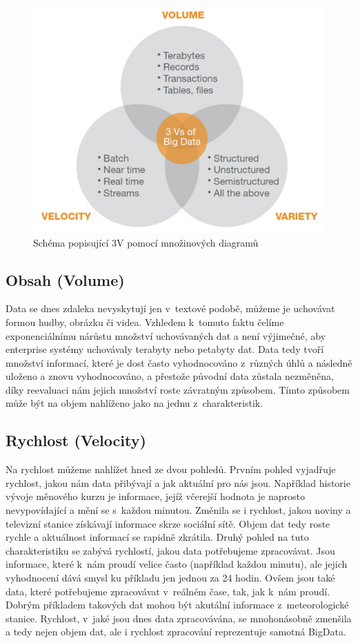 \begin{figure}[h]
\centering
\includegraphics[scale=0.6]{images/3v}
\caption{Schéma popisující 3V pomocí množinových diagramů \cite{3vimg}}
\label{fig:3v}

\end{figure}

\subsection[3v-volume]{Obsah (Volume)}
Data se dnes zdaleka nevyskytují jen v~textové podobě, můžeme je uchovávat formou hudby, obrázku či videa. Vzhledem k~tomuto faktu čelíme exponenciálnímu nárůstu množství uchovávaných dat a není výjimečné, aby enterprise systémy uchovávaly terabyty nebo petabyty dat. Data tedy tvoří množství informací, které je dost často vyhodnocováno z~různých úhlů a následně uloženo a znovu vyhodnocováno, a přestože původní data zůstala nezměněna, díky reevaluaci nám jejich množství roste závratným způsobem. Tímto způsobem může být na objem nahlíženo jako na jednu z~charakteristik. %

\subsection{Rychlost (Velocity)}
Na rychlost můžeme nahlížet hned ze dvou pohledů. Prvním pohled vyjadřuje rychlost, jakou nám data přibývají a jak aktuální pro nás jsou. Například historie vývoje měnového kurzu je informace, jejíž včerejší hodnota je naprosto nevypovídající a mění se s~každou minutou. Změnila se i rychlost, jakou noviny a televizní stanice získávají informace skrze sociální sítě. Objem dat tedy roste rychle a aktuálnost informací se rapidně zkrátila. Druhý pohled na tuto charakteristiku se zabývá rychlostí, jakou data potřebujeme zpracovávat. Jsou informace, které k~nám proudí velice často (například každou minutu), ale jejich vyhodnocení dává smysl ku příkladu jen jednou za 24 hodin. Ovšem jsou také data, které potřebujeme zpracovávat v~reálném čase, tak, jak k~nám proudí. Dobrým příkladem takových dat mohou být akutální informace z~meteorologické stanice. 
Rychlost, v~jaké jsou dnes data zpracovávána, se mnohonásobně zmenšila a tedy nejen objem dat, ale i rychlost zpracování reprezentuje samotná BigData.

